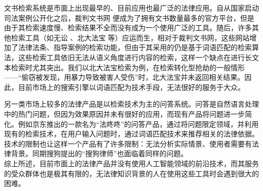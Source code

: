 文书检索系统是市面上出现最早的、目前应用也最广泛的法律应用。自从国家启动司法案例公开化之后，裁判文书网 便成为了拥有文书数量最多的官方平台，但是由于其检索速度慢、检索结果不全而没有成为一个使用广泛的工具。随后，许多其他检索工具（如无讼 、北大法宝 等）应运而生，相对于裁判文书网，这些网站增加了法律法条、指导案例的检索功能，但由于其采用的仍是基于词语匹配的检索算法，这些检索工具依旧无法从语义角度进行内容的检索，这样一个缺点在进行长文本检索时尤其突出。我们以北大法宝检索为例，在检索转化型抢劫的一般情形——“偷窃被发现，用暴力导致被害人受伤”时，北大法宝并未返回相关结果。因此，目前市场上的搜索引擎以词语匹配为技术手段，无法很好的服务于大众。

另一类市场上较多的法律产品是以检索技术为主的问答系统。问答是自然语言处理中的热门问题，但因为效果原因并未有很好的应用，而现有产品将问题进一步简化。例如京东推出的一款名为“法咚咚”的问答产品，通过将问题限定领域，并利用现有的检索技术，在用户输入问题时，通过词语匹配技术来推荐相关的法律依据。技术的限制也让这样一个产品有了许多限制：无法分析实际情景、使用者需要有法律背景。同期搜狗提出的“搜狗律师”也面临着同样的问题。\\

综上所述，目前市面上的法律产品并没有使用人工智能领域的前沿技术，而其服务的受众群体也是极其有限的，无法律知识背景的人在使用这些工具时会遇到很大的困难。

